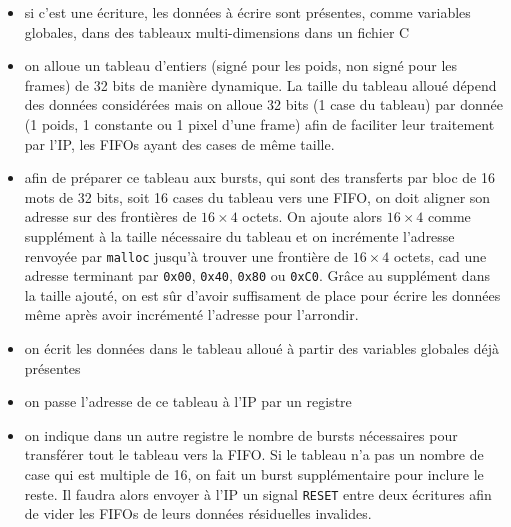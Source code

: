 \begin{itemize}
	\item si c'est une écriture, les données à écrire sont présentes, comme
		variables globales, dans des tableaux multi-dimensions dans un
		fichier C
	\item on alloue un tableau d'entiers (signé pour les poids, non signé
		pour les frames) de 32 bits de manière dynamique. La taille
		du tableau alloué dépend des données considérées mais on alloue
		32 bits (1 case du tableau) par donnée (1 poids, 1 constante ou
		1 pixel d'une frame) afin de faciliter leur traitement par l'IP,
		les FIFOs ayant des cases de même taille.
	\item afin de préparer ce tableau aux bursts, qui sont des transferts
		par bloc
		de 16 mots de 32 bits, soit 16 cases du tableau vers une FIFO,
		on doit aligner son adresse sur des frontières de $16 \times
		4$ octets. On ajoute alors $16 \times 4$ comme supplément à la
		taille nécessaire du tableau et on incrémente l'adresse
		renvoyée par \texttt{malloc} jusqu'à trouver une frontière de
		$16 \times 4$ octets, cad une adresse terminant par
		\texttt{0x00}, \texttt{0x40}, \texttt{0x80} ou \texttt{0xC0}.
		Grâce au supplément dans la taille ajouté, on est sûr d'avoir
		suffisament de place pour écrire les données même après avoir
		incrémenté l'adresse pour l'arrondir.
	\item on écrit les données dans le tableau alloué à partir des
		variables globales déjà présentes
	\item on passe l'adresse de ce tableau à l'IP par un registre
	\item on indique dans un autre registre le nombre de bursts nécessaires
		pour transférer tout le tableau vers la FIFO. Si le tableau n'a
		pas un nombre de case qui est multiple de 16, on fait un burst
		supplémentaire pour inclure le reste. Il faudra alors
		envoyer à l'IP un signal \texttt{RESET} entre deux écritures
		afin de vider les FIFOs de leurs données résiduelles invalides.
\end{itemize}
